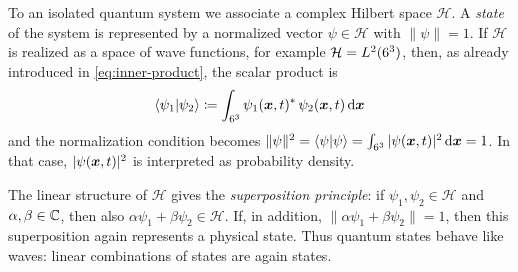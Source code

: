 To an isolated quantum system we associate a complex Hilbert space $\mathcal{H}$.
A \emph{state} of the system is represented by a normalized vector
\(
\psi \in \mathcal{H}
\)
with
\(
\|\psi\| = 1
\).
If $\mathcal{H}$ is realized as a space of wave functions, for example $\mathcal{H} = L^2(6^3)$, then, as already introduced in \eqref{eq:inner-product}, the scalar product is
\[
\braket{\psi_1 | \psi_2}
\coloneq
\int_{6^3} \psi_1({\boldsymbol{x}}, t)^* \, \psi_2({\boldsymbol{x}}, t) \,\mathrm{d} {\boldsymbol{x}}
\]
and the normalization condition becomes
\(
\|\psi\|^2
=
\braket{\psi | \psi}
=
\int_{6^3} |\psi({\boldsymbol{x}}, t)|^2 \,\mathrm{d} {\boldsymbol{x}}
=
1
\).
In that case, $|\psi({\boldsymbol{x}}, t)|^2$ is interpreted as probability density.

The linear structure of $\mathcal{H}$ gives the \emph{superposition principle}:
if $\psi_1,\psi_2 \in \mathcal{H}$ and $\alpha,\beta \in \mathbb{C}$, then also
\(
\alpha \psi_1 + \beta \psi_2 \in \mathcal{H}
\).
If, in addition,
\(
\|\alpha \psi_1 + \beta \psi_2\| = 1
\),
then this superposition again represents a physical state.
Thus quantum states behave like waves: linear combinations of states are again states.






